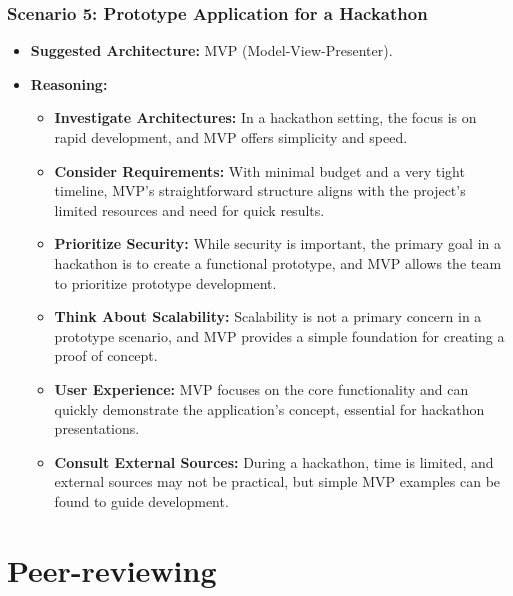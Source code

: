 \subsection*{Scenario 5: Prototype Application for a Hackathon}
\begin{itemize}
	\item \textbf{Suggested Architecture:} MVP (Model-View-Presenter).
	\item \textbf{Reasoning:}
	\begin{itemize}
		\item \textbf{Investigate Architectures:} In a hackathon setting, the focus is on rapid development, and MVP offers simplicity and speed.
		\item \textbf{Consider Requirements:} With minimal budget and a very tight timeline, MVP's straightforward structure aligns with the project's limited resources and need for quick results.
		\item \textbf{Prioritize Security:} While security is important, the primary goal in a hackathon is to create a functional prototype, and MVP allows the team to prioritize prototype development.
		\item \textbf{Think About Scalability:} Scalability is not a primary concern in a prototype scenario, and MVP provides a simple foundation for creating a proof of concept.
		\item \textbf{User Experience:} MVP focuses on the core functionality and can quickly demonstrate the application's concept, essential for hackathon presentations.
		\item \textbf{Consult External Sources:} During a hackathon, time is limited, and external sources may not be practical, but simple MVP examples can be found to guide development.
	\end{itemize}
\end{itemize}


\chapter{Peer-reviewing}